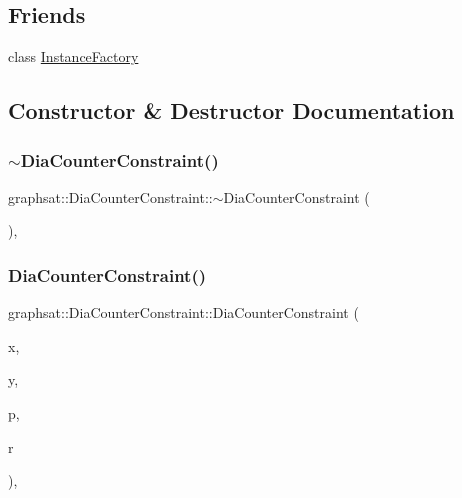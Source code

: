 \subsection*{Friends}
\begin{DoxyCompactItemize}
\item 
class \mbox{\hyperlink{classgraphsat_1_1_dia_counter_constraint_ad4b3c25c041701ae56dc1e78df779d2f}{Instance\+Factory}}
\end{DoxyCompactItemize}


\subsection{Constructor \& Destructor Documentation}
\mbox{\label{classgraphsat_1_1_dia_counter_constraint_a4a1e57fd6bf743dcd7430b03b85ebebb}} 
\subsubsection{\texorpdfstring{$\sim$DiaCounterConstraint()}{~DiaCounterConstraint()}}
{\footnotesize\ttfamily graphsat\+::\+Dia\+Counter\+Constraint\+::$\sim$\+Dia\+Counter\+Constraint (\begin{DoxyParamCaption}{ }\end{DoxyParamCaption})\hspace{0.3cm}{\ttfamily [inline]}, {\ttfamily [protected]}}

\mbox{\label{classgraphsat_1_1_dia_counter_constraint_a16aa92c2e28e0a3e5e110f413a9a3035}} 
\subsubsection{\texorpdfstring{DiaCounterConstraint()}{DiaCounterConstraint()}}
{\footnotesize\ttfamily graphsat\+::\+Dia\+Counter\+Constraint\+::\+Dia\+Counter\+Constraint (\begin{DoxyParamCaption}\item[{int}]{x,  }\item[{int}]{y,  }\item[{\mbox{\hyperlink{namespacegraphsat_acfb5939f9bdafbd9aea0d084b9a56f69}{C\+O\+M\+P\+\_\+\+O\+P\+E\+R\+A\+T\+OR}}}]{p,  }\item[{int}]{r }\end{DoxyParamCaption})\hspace{0.3cm}{\ttfamily [inline]}, {\ttfamily [private]}}

